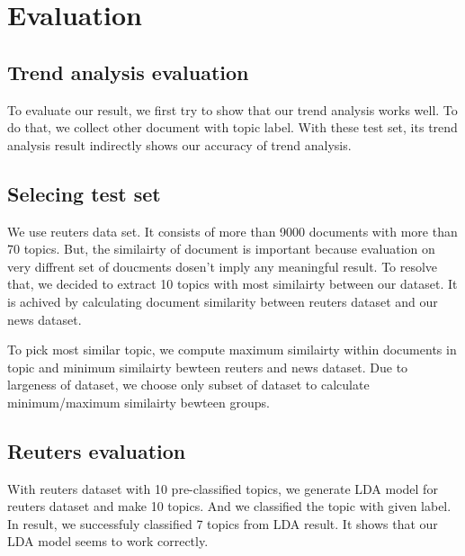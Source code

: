 \section{Evaluation}

\subsection{Trend analysis evaluation}
To evaluate our result, we first try to show that our trend analysis
works well. To do that, we collect other document with topic label.
With these test set, its trend analysis result indirectly shows our
accuracy of trend analysis.
\subsection{Selecing test set}
We use reuters data set. It consists of more than 9000 documents
with more than 70 topics. But, the similairty of document is important
because evaluation on very diffrent set of doucments dosen't imply
any meaningful result. To resolve that, we decided to extract 10 topics
with most similairty between our dataset. It is achived by calculating
document similarity between reuters dataset and our news dataset.

To pick most similar topic, we compute maximum similairty within documents
in topic and minimum similairty bewteen reuters and news dataset. Due to
largeness of dataset, we choose only subset of dataset to calculate
minimum/maximum similairty bewteen groups.

\subsection{Reuters evaluation}
With reuters dataset with 10 pre-classified topics, we generate LDA
model for reuters dataset and make 10 topics. And we classified the topic
with given label. In result, we successfuly classified 7 topics from
LDA result. It shows that our LDA model seems to work correctly.
